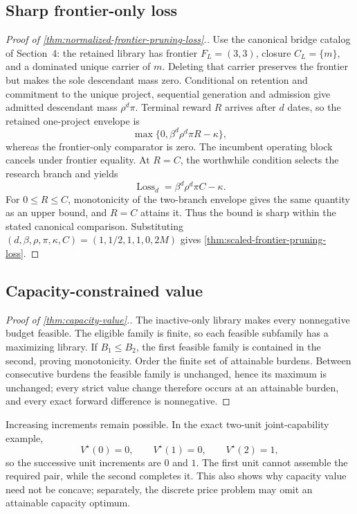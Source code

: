 \subsection{Sharp frontier-only loss}
\label{app:bridge-catalog}

\begin{proof}[Proof of \cref{thm:normalized-frontier-pruning-loss}.]
Use the canonical bridge catalog of Section~4: the retained library has
frontier \(F_L=(3,3)\), closure \(C_L=\{m\}\), and a dominated unique carrier
of \(m\).  Deleting that carrier preserves the frontier but makes the sole
descendant mass zero.  Conditional on retention and commitment to the unique
project, sequential generation and admission give admitted descendant mass
\(\rho^d\pi\).  Terminal reward \(R\) arrives after \(d\) dates, so the
retained one-project envelope is
\[
 \max\{0,\beta^d\rho^d\pi R-\kappa\},
\]
whereas the frontier-only comparator is zero.  The incumbent operating block
cancels under frontier equality.  At \(R=C\), the worthwhile condition selects
the research branch and yields
\[
 \operatorname{Loss}_d=\beta^d\rho^d\pi C-\kappa.
\]
For \(0\le R\le C\), monotonicity of the two-branch envelope gives the same
quantity as an upper bound, and \(R=C\) attains it.  Thus the bound is sharp
within the stated canonical comparison.  Substituting
\((d,\beta,\rho,\pi,\kappa,C)=(1,1/2,1,1,0,2M)\) gives
\cref{thm:scaled-frontier-pruning-loss}.
\end{proof}

\subsection{Capacity-constrained value}
\label{app:capacity-proof}

\begin{proof}[Proof of \cref{thm:capacity-value}.]
The inactive-only library makes every nonnegative budget feasible.  The
eligible family is finite, so each feasible subfamily has a maximizing
library.  If \(B_1\le B_2\), the first feasible family is contained in the
second, proving monotonicity.  Order the finite set of attainable burdens.
Between consecutive burdens the feasible family is unchanged, hence its
maximum is unchanged; every strict value change therefore occurs at an
attainable burden, and every exact forward difference is nonnegative.
\end{proof}

Increasing increments remain possible.  In the exact two-unit
joint-capability example,
\[
 V^\star(0)=0,\qquad V^\star(1)=0,\qquad V^\star(2)=1,
\]
so the successive unit increments are \(0\) and \(1\).  The first unit cannot
assemble the required pair, while the second completes it.  This also shows
why capacity value need not be concave; separately, the discrete price problem
may omit an attainable capacity optimum.

